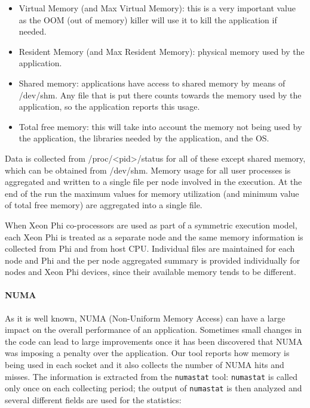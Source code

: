 \documentclass[10pt,a4paper]{report}
\begin{document}
\begin{itemize}
\item Virtual Memory (and Max Virtual Memory): this is a very important value as the OOM (out of memory) killer will use it to kill the application if needed.
\item Resident Memory (and Max Resident Memory): physical memory used by the application.
\item Shared memory: applications have access to shared memory by means of /dev/shm. Any file that is put there counts towards the memory used by the application, so the application reports this usage.
\item Total free memory: this will take into account the memory not being used by the application, the libraries needed by the application, and the OS.
\end{itemize}

Data is collected from /proc/\textless pid\textgreater /status for all of these except shared memory, which can be obtained from /dev/shm. Memory usage for all user processes is aggregated and written to a single file per node involved in the execution. At the end of the run the maximum values for memory utilization (and minimum value of total free memory) are aggregated into a single file.

When Xeon Phi co-processors are used as part of a symmetric execution model, each Xeon Phi is treated as a separate node and the same memory information is collected from Phi and from host CPU. Individual files are maintained for each node and Phi and the per node aggregated summary is provided individually for nodes and Xeon Phi devices, since their available memory tends to be different.

\paragraph{NUMA}
As it is well known, NUMA (Non-Uniform Memory Access) can have a large impact on the overall performance of an application. Sometimes small changes in the code can lead to large improvements once it has been discovered that NUMA was imposing a penalty over the application. Our tool reports how memory is being used in each socket and it also collects the number of NUMA hits and misses. The information is extracted from the \texttt{numastat} tool: \texttt{numastat} is called only once on each collecting period; the output of \texttt{numastat} is then analyzed and several different fields are used for the statistics:
\end{document}
